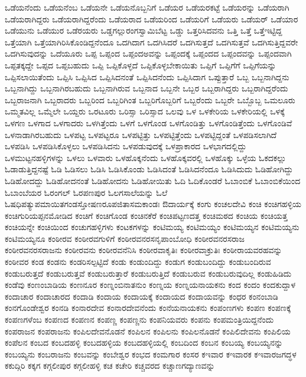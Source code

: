 {ಒಡೆಯನೆಂದು
ಒಡೆಯನೆಂಬ
ಒಡೆಯನೇ
ಒಡೆಯನೊಬ್ಬನಿಗೆ
ಒಡೆಯರ
ಒಡೆಯರಕಟ್ಟೆ
ಒಡೆಯರನ್ನು
ಒಡೆಯರಾಗಿ
ಒಡೆಯರಾಗಿದ್ದರು
ಒಡೆಯರಾಗಿದ್ದರೆಂದು
ಒಡೆಯರಾದ
ಒಡೆಯರಿಂದ
ಒಡೆಯರಿಗೆ
ಒಡೆಯರು
ಒಡೆಯರ್
ಒಡೆಯಾರ
ಒಡೆಯುನು
ಒಡೆಯುರ
ಒಡೆರಯರು
ಒಡ್ಡಗಲ್ಲುರಂಗಸ್ವಾಮಿಬೆಟ್ಟ
ಒಡ್ಡು
ಒತ್ತರಿಸಿದವನು
ಒತ್ತಿ
ಒತ್ತೆ
ಒತ್ತೆಇಟ್ಟಿದ್ದ
ಒತ್ತೆಯಾಗಿ
ಒತ್ತೆಯಾಗಿರಿಸಿಕೊಂಡಿದ್ದನೆಂದೂ
ಒದಗಿದಾಗ
ಒದಗಿಸಿದರೆ
ಒದಗಿಸುತ್ತದೆ
ಒದಗಿಸುತ್ತವೆ
ಒದಗಿಸುತ್ತಿದ್ದವರೇ
ಒದಗಿಸುವುದನ್ನು
ಒದೆಯೂರು
ಒಪ್ಪ
ಒಪ್ಪಂದ
ಒಪ್ಪಂದಅವನ್ನು
ಒಪ್ಪಂದಕ್ಕೆ
ಒಪ್ಪಂದದ
ಒಪ್ಪಂದವನ್ನು
ಒಪ್ಪಂದವಾಗಿ
ಒಪ್ಪತಕ್ಕದ್ದೇ
ಒಪ್ಪದ
ಒಪ್ಪಬಹುದು
ಒಪ್ಪಿ
ಒಪ್ಪಿಕೊಳ್ಳದೆ
ಒಪ್ಪಿಕೊಳ್ಳಬೇಕಾಯಿತು
ಒಪ್ಪಿಗೆ
ಒಪ್ಪಿಗೆಗೆ
ಒಪ್ಪಿಗೆಯನ್ನು
ಒಪ್ಪಿಸಲಾಯಿತೆಂದು
ಒಪ್ಪಿಸಿ
ಒಪ್ಪಿಸಿದ
ಒಪ್ಪಿಸಿದನಂತೆ
ಒಪ್ಪಿಸಿದನೆಂದು
ಒಪ್ಪಿಸಿದಾಗ
ಒಪ್ಪುತ್ತಾರೆ
ಒಬ್ಬ
ಒಬ್ಬನಾಗಿದ್ದನು
ಒಬ್ಬನಾಗಿದ್ದು
ಒಬ್ಬನಾಗಿರಬಹುದು
ಒಬ್ಬನಾಗಿರುವ
ಒಬ್ಬನಾದ
ಒಬ್ಬನೇ
ಒಬ್ಬರ
ಒಬ್ಬರಾಗಿದ್ದರು
ಒಬ್ಬರಾಗಿದ್ದರೆಂದು
ಒಬ್ಬರಾಜನಾಗಿ
ಒಬ್ಬರಾದರು
ಒಬ್ಬರಿಂದ
ಒಬ್ಬರಿಗಿಂತ
ಒಬ್ಬರಿಗೊಬ್ಬರಿಗೆ
ಒಬ್ಬರೆಂದು
ಒಬ್ಬರೇ
ಒಬ್ಬೊಬ್ಬ
ಒಮಲೂರು
ಒಮ್ಮತವಿಲ್ಲ
ಒಮ್ಮೆಲೇ
ಒಯ್ದರು
ಒರಟೂರು
ಒರಿಸ್ಸಾ
ಒರಿಸ್ಸಾದ
ಒಲವು
ಒಳ
ಒಳಕೇರಿಯ
ಒಳಕೇರಿಯಲ್ಲಿ
ಒಳಕ್ಕೆ
ಒಳಗಣ
ಒಳಗಾದ
ಒಳಗಾದರು
ಒಳಗಿತ್ತೆಂದು
ಒಳಗೆ
ಒಳಗೊಂಡ
ಒಳಗೊಂಡಿತ್ತು
ಒಳಗೊಂಡಿತ್ತೆಂದು
ಒಳಗೊಂಡಿವೆ
ಒಳನಾಡಾಗಿರಬಹುದು
ಒಳಪಟ್ಟ
ಒಳಪಟ್ಟರೂ
ಒಳಪಟ್ಟಿತ್ತು
ಒಳಪಟ್ಟಿತ್ತೆಂದು
ಒಳಪಟ್ಟಿದ್ದಂತೆ
ಒಳಪಡಿಸಲಾಗಿದೆ
ಒಳಪಡಿಸಿ
ಒಳಪಡಿಸಿಕೊಳ್ಳಲು
ಒಳಪಡಿಸಿದನು
ಒಳಪಡುವುದಕ್ಕೆ
ಒಳಪ್ರಾಕಾರದ
ಒಳಭಾಗದಲ್ಲಿದ್ದು
ಒಳಮುಟ್ಟನಹಳ್ಳಿಗಳನ್ನು
ಒಳಲು
ಒಳವಾರು
ಒಳಹೊಕ್ಕನೆಂದು
ಒಳಹೊಕ್ಕವರಲ್ಲಿ
ಒಳಹೊಕ್ಕು
ಒಳ್ಳೆಯ
ಓಕದಕಲ್ಲು
ಓಡಾಡುತ್ತಿದ್ದನಷ್ಟೆ
ಓಡಿ
ಓಡಿಸಲು
ಓಡಿಸಿ
ಓಡಿಸಿಕೊಂಡು
ಓಡಿಸಿದಂತೆ
ಓಡಿಸಿದನೆಂದೂ
ಓಡಿಸಿದುದು
ಓಡಿಹೋಗಿದ್ದು
ಓಡಿಹೋದದ್ದು
ಓಡಿಹೋದನಂತೆ
ಓಡಿಹೋದನು
ಓಡಿಹೋಯಿತು
ಓದಿ
ಓದಿಕೊಂಡರೆ
ಓಬಾಂಬಿಕೆ
ಓಬಾಂಬಿಕೆಯಿಂದ
ಓಬಾಂಬೆಯರ
ಓರಂಗಲ್
ಓರಪಣಪುರ
ಓಲಗಸಾಲೆಯನ್ನು
ಓಲೆ
ಓಷಧಿಪತ್ಯುಪಮಾಯಿತಗಂಡಸ್ತೋಷಣರೂಪಜಿತಾಸಮಕಾಂಡಃ
ಔದಾರ್ಯಕ್ಕೆ
ಕಂಗು
ಕಂಚಲದೇವಿ
ಕಂಚಿ
ಕಂಚಿಗಹಳ್ಳಿಯ
ಕಂಚಿಗುರಿಯಪ್ಪನಮೋಡಿದ
ಕಂಚಿಗೆ
ಕಂಚಿಗೊಂಡ
ಕಂಚಿನಕೆರೆ
ಕಂಚಿಪಟ್ಟಣದತ್ತ
ಕಂಚಿಮಠದ
ಕಂಚಿಯ
ಕಂಚಿಯತ್ತ
ಕಂಚಿಯನ್ನೇ
ಕಂಚಿಯಿಂದ
ಕಂಚುಗಹಳ್ಳಿಗಳು
ಕಂಟಕಗಳನ್ನು
ಕಂಟಿಮಯ್ಯ
ಕಂಟಿಮಯ್ಯಂ
ಕಂಟಿಮಯ್ಯನ
ಕಂಟಿಮಯ್ಯನು
ಕಂಟಿಮಯ್ಯನೂ
ಕಂಠೀರವ
ಕಂಠೀರವಗುಳಿಗೆ
ಕಂಠೀರವನರಸನೃಪಾಂಬೋಧಿ
ಕಂಠೀರವನರಸರಾಜ
ಕಂಠೀರವನರಸರಾಜನು
ಕಂಠೀರವನು
ಕಂಠೀರವನೆನಿಸಿ
ಕಂಠೀರವಾಕೃತಿಃ
ಕಂಠೀರವಾಕ್ರುತಿಃ
ಕಂಠೀರಾಯವರಹವನ್ನು
ಕಂಠೀವರ
ಕಂಡ
ಕಂಡನು
ಕಂಡರಿಸಲ್ಪಟ್ಟಿದೆ
ಕಂಡು
ಕಂಡುಂದಿದ್ದು
ಕಂಡುಗ
ಕಂಡುಬಂದಿದ್ದು
ಕಂಡುಬಂದಿರುವ
ಕಂಡುಬರುತ್ತದೆ
ಕಂಡುಬರುತ್ತವೆ
ಕಂಡುಬರುತ್ತಾರೆ
ಕಂಡುಬರುತ್ತಿದೆ
ಕಂಡುಬರುವ
ಕಂಡುಬರುವುದಿಲ್ಲ
ಕಂಡುಹಿಡಿದು
ಕಂಡೆವು
ಕಂಣಂಬಾಡಿಯ
ಕಂಣನೂರ
ಕಂಣ್ನಂಬಿನಾತನುಂ
ಕಂಣ್ನಯ
ಕಂಣ್ನಯನಾಯಕನು
ಕಂದ
ಕಂದಂ
ಕಂದಕುದ್ದಾಳ
ಕಂದಾಚಾರ
ಕಂದಾಚಾರದ
ಕಂದಾಡಿ
ಕಂದಾಯ
ಕಂದಾಯಕ್ಕೆ
ಕಂದಾಯದ
ಕಂದಾಯವನ್ನು
ಕಂಧರ
ಕಂನಂಬಾಡಿ
ಕಂನಗೊಂಡೇಶ್ವರ
ಕಂನಡಿ
ಕಂನಾರದೇವ
ಕಂನಾರದೇವನೆಂದು
ಕಂನೆಯನಾಯಕನು
ಕಂಪಂಣಗಳು
ಕಂಪಣ
ಕಂಪಣಕ್ಕೆ
ಕಂಪಣಗಳೆಂಬ
ಕಂಪಣದ
ಕಂಪಣನ
ಕಂಪಣ್ಣ
ಕಂಪಣ್ಣನು
ಕಂಪನಿಯವರು
ಕಂಪನು
ಕಂಪಮಂತ್ರಿಯಿದ್ದನೆಂದು
ಕಂಪರಾಜನ
ಕಂಪರಾಜನು
ಕಂಪಿಲದೇವನೊಡನೆ
ಕಂಪಿಲನ
ಕಂಪಿಲನು
ಕಂಪಿಲನೊಡನೆ
ಕಂಪಿಲಿದೇವನು
ಕಂಪಿಲಿಯ
ಕಂಪೆಲನ
ಕಂಬದ
ಕಂಬದಹಳ್ಳಿ
ಕಂಬದಹಳ್ಳಿಯ
ಕಂಬದಹಳ್ಳಿಯಲ್ಲಿ
ಕಂಬದಿಂದ
ಕಂಬನ
ಕಂಬಯ್ಯ
ಕಂಬಯ್ಯನನ್ನು
ಕಂಬಯ್ಯನು
ಕಂಬರಾಜನು
ಕಂಬವನ್ನು
ಕಂಬೇಶ್ವರ
ಕಂಭದ
ಕಂಮಗಾರ
ಕಂಸರ
ಕಇವಾರ
ಕಇವಾರಕ
ಕಇವಾರಜಗದ್ಧಳ
ಕಕುದ್ಗಿರಿ
ಕಕ್ಕಗ
ಕಗ್ಗಲೀಪುರ
ಕಗ್ಗಲೀಹಳ್ಳಿ
ಕಚ
ಕಚೇರಿ
ಕಚ್ಚವರದ
ಕಚ್ಚಾಣಗದ್ಯಾಣವನ್ನು
}
